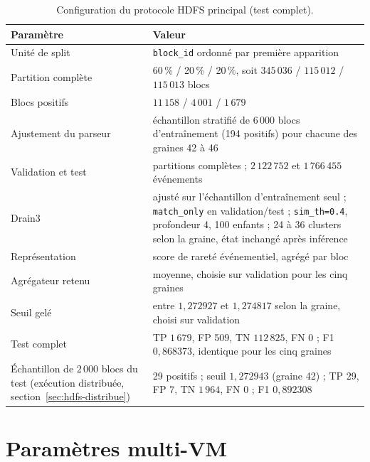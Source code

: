 \begin{table}[H]
\centering
\caption{Configuration du protocole HDFS principal (test complet).}
\label{tab:hdfs-parametres-annexe}
\begin{tabularx}{\textwidth}{p{} X}
\toprule
\textbf{Paramètre} & \textbf{Valeur} \\
\midrule
Unité de split & \texttt{block\_id} ordonné par première apparition \\
Partition complète & 60\,\% / 20\,\% / 20\,\%, soit $345\,036$ / $115\,012$ / $115\,013$ blocs \\
Blocs positifs & $11\,158$ / $4\,001$ / $1\,679$ \\
Ajustement du parseur & échantillon stratifié de $6\,000$ blocs d'entraînement (194 positifs) pour chacune des graines 42 à 46 \\
Validation et test & partitions complètes ; $2\,122\,752$ et $1\,766\,455$ événements \\
Drain3 & ajusté sur l'échantillon d'entraînement seul ; \texttt{match\_only} en validation/test ; \texttt{sim\_th=0.4}, profondeur 4, 100 enfants ; 24 à 36 clusters selon la graine, état inchangé après inférence \\
Représentation & score de rareté événementiel, agrégé par bloc \\
Agrégateur retenu & moyenne, choisie sur validation pour les cinq graines \\
Seuil gelé & entre $1{,}272927$ et $1{,}274817$ selon la graine, choisi sur validation \\
Test complet & TP $1\,679$, FP 509, TN $112\,825$, FN 0 ; F1 $0{,}868373$, identique pour les cinq graines \\
Échantillon de $2\,000$ blocs du test (exécution distribuée, section~\ref{sec:hdfs-distribue}) & 29 positifs ; seuil $1{,}272943$ (graine 42) ; TP 29, FP 7, TN $1\,964$, FN 0 ; F1 $0{,}892308$ \\
\bottomrule
\end{tabularx}
\end{table}

\section{Paramètres multi-VM}

